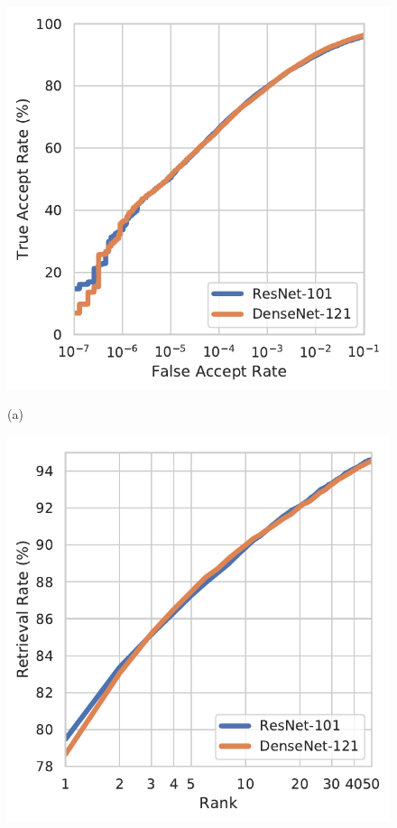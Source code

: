 \documentclass{article}
\begin{document}
\begin{figure}[htb]
\begin{minipage}[b]{.33\linewidth}
  \centering
  \centerline{\includegraphics[width=\linewidth]{FaRE-IJB-C-ROC}}
  \centerline{(a)}\medskip
\end{minipage}
\hfill
\begin{minipage}[b]{0.33\linewidth}
  \centering
  \centerline{\includegraphics[width=\linewidth]{FaRE-IJB-C-CMC}}

\end{minipage}
\end{figure}
\end{document}
